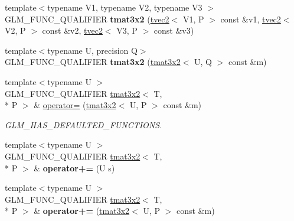 \begin{DoxyCompactItemize}
\item 
\hypertarget{structglm_1_1tmat3x2_a1d369b5df9f52f6561912a6d8d4d581b}{{\footnotesize template$<$typename V1, typename V2, typename V3 $>$ }\\G\-L\-M\-\_\-\-F\-U\-N\-C\-\_\-\-Q\-U\-A\-L\-I\-F\-I\-E\-R {\bfseries tmat3x2} (\hyperlink{structglm_1_1tvec2}{tvec2}$<$ V1, P $>$ const \&v1, \hyperlink{structglm_1_1tvec2}{tvec2}$<$ V2, P $>$ const \&v2, \hyperlink{structglm_1_1tvec2}{tvec2}$<$ V3, P $>$ const \&v3)}\label{structglm_1_1tmat3x2_a1d369b5df9f52f6561912a6d8d4d581b}

\item 
\hypertarget{structglm_1_1tmat3x2_ad33526a04ab8966123185267eb201755}{{\footnotesize template$<$typename U, precision Q$>$ }\\G\-L\-M\-\_\-\-F\-U\-N\-C\-\_\-\-Q\-U\-A\-L\-I\-F\-I\-E\-R {\bfseries tmat3x2} (\hyperlink{structglm_1_1tmat3x2}{tmat3x2}$<$ U, Q $>$ const \&m)}\label{structglm_1_1tmat3x2_ad33526a04ab8966123185267eb201755}

\item 
\hypertarget{structglm_1_1tmat3x2_ac868522f7be6e78c28c6d00deb181060}{{\footnotesize template$<$typename U $>$ }\\G\-L\-M\-\_\-\-F\-U\-N\-C\-\_\-\-Q\-U\-A\-L\-I\-F\-I\-E\-R \hyperlink{structglm_1_1tmat3x2}{tmat3x2}$<$ T, \\*
P $>$ \& \hyperlink{structglm_1_1tmat3x2_ac868522f7be6e78c28c6d00deb181060}{operator=} (\hyperlink{structglm_1_1tmat3x2}{tmat3x2}$<$ U, P $>$ const \&m)}\label{structglm_1_1tmat3x2_ac868522f7be6e78c28c6d00deb181060}

\begin{DoxyCompactList}\small\item\em G\-L\-M\-\_\-\-H\-A\-S\-\_\-\-D\-E\-F\-A\-U\-L\-T\-E\-D\-\_\-\-F\-U\-N\-C\-T\-I\-O\-N\-S. \end{DoxyCompactList}\item 
\hypertarget{structglm_1_1tmat3x2_a36d12514d28052aae7538bba36709e81}{{\footnotesize template$<$typename U $>$ }\\G\-L\-M\-\_\-\-F\-U\-N\-C\-\_\-\-Q\-U\-A\-L\-I\-F\-I\-E\-R \hyperlink{structglm_1_1tmat3x2}{tmat3x2}$<$ T, \\*
P $>$ \& {\bfseries operator+=} (U s)}\label{structglm_1_1tmat3x2_a36d12514d28052aae7538bba36709e81}

\item 
\hypertarget{structglm_1_1tmat3x2_aab711028912b77b4658892c5a1a3a5a9}{{\footnotesize template$<$typename U $>$ }\\G\-L\-M\-\_\-\-F\-U\-N\-C\-\_\-\-Q\-U\-A\-L\-I\-F\-I\-E\-R \hyperlink{structglm_1_1tmat3x2}{tmat3x2}$<$ T, \\*
P $>$ \& {\bfseries operator+=} (\hyperlink{structglm_1_1tmat3x2}{tmat3x2}$<$ U, P $>$ const \&m)}\label{structglm_1_1tmat3x2_aab711028912b77b4658892c5a1a3a5a9}


\end{DoxyCompactItemize}
